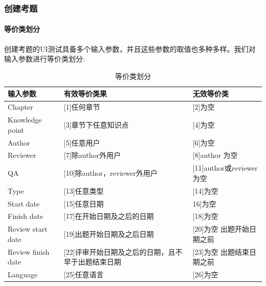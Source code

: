 \documentclass[hyperref, a4paper]{ctexart}
\let\oldparagraph\paragraph
\renewcommand{\paragraph}[1]{\oldparagraph{#1}\mbox{}}
\begin{document}
\hypertarget{ux521bux5efaux8003ux9898-1}{%
\subsubsection{创建考题}\label{ux521bux5efaux8003ux9898-1}}

\hypertarget{ux7b49ux4ef7ux7c7bux5212ux5206-1}{%
\paragraph{等价类划分}\label{ux7b49ux4ef7ux7c7bux5212ux5206-1}}

创建考题的UI测试具备多个输入参数，并且这些参数的取值也多种多样。我们对输入参数进行等价类划分:

\begin{table}[!htbp]
  \caption{等价类划分}
  \label{Tab:bookRWCal}
  \centering
  \begin{tabular}{|p{3.5cm}|p{5.0cm}|p{4.0cm}|}
  \hline
  \textbf{输入参数} &\textbf{有效等价类果} &\textbf{无效等价类 }\\
  \hline
  Chapter     & [1]任何章节     & [2]为空 \\
  \hline
  Knowledge point  & [3]章节下任意知识点    & [4]为空  \\
  \hline
  Author   & [5]任意用户    & [6]为空 \\
  \hline
  Reviewer    & [7]除author外用户       & [8]author \newline [9]为空 \\
  \hline
  QA     & [10]除author，reviewer外用户      & [11]author或reviewer
\newline [12]为空 \\
  \hline
  Type     & [13]任意类型       & [14]为空  \\
  \hline
  Start date   & [15]任意日期       & 16]为空  \\
  \hline
  Finish date      & [17]在开始日期及之后的日期    & [18]为空 \\
  \hline
  Review start date    & [19]出题开始日期及之后日期        & [20]为空 \newline [21]出题开始日期之前 \\
  \hline
  Review finish date   & [22]评审开始日期及之后的日期，且不早于出题结束日期    & [23]为空 \newline  [24]出题结束日期之前 \\
  \hline
  Language    & [25]任意语言    & [26]为空 \\
  \hline
  \end{tabular}
\end{table}
\end{document}
